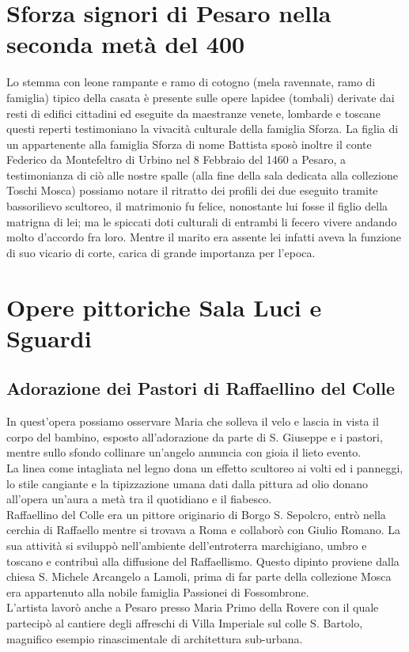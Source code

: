 \documentclass[hidelinks,12pt,a4paper]{article}
\begin{document}
\begin{flushleft}
			\section{Sforza signori di Pesaro nella seconda metà del 400}
			Lo stemma con leone rampante e ramo di cotogno (mela ravennate, ramo di famiglia) tipico della casata è presente sulle opere lapidee (tombali) derivate dai resti di edifici cittadini ed eseguite da maestranze venete, lombarde e toscane questi reperti testimoniano la vivacità culturale della famiglia Sforza. La figlia di un appartenente alla famiglia Sforza di nome Battista sposò inoltre il conte Federico da Montefeltro di Urbino nel 8 Febbraio del 1460 a Pesaro, a testimonianza di ciò alle nostre spalle (alla fine della sala dedicata alla collezione Toschi Mosca) possiamo notare il ritratto dei profili dei due eseguito tramite bassorilievo scultoreo, il matrimonio fu felice, nonostante lui fosse il figlio della matrigna di lei; ma le spiccati doti culturali di entrambi li fecero vivere andando molto d'accordo fra loro. Mentre il marito era assente lei infatti aveva la funzione di suo vicario di corte, carica di grande importanza per l'epoca.
	
			\section{Opere pittoriche Sala Luci e Sguardi} 
	
			\subsection{Adorazione dei Pastori di Raffaellino del Colle}
			In quest'opera possiamo osservare Maria che solleva il velo e lascia in vista il corpo del bambino, esposto all'adorazione da parte di S. Giuseppe e i pastori, mentre sullo sfondo collinare un'angelo annuncia con gioia il lieto evento.\\
			La linea come intagliata nel legno dona un effetto scultoreo ai volti ed i panneggi, lo stile cangiante e la tipizzazione umana dati dalla pittura ad olio donano all'opera un'aura a metà tra il quotidiano e il fiabesco.\\
			Raffaellino del Colle era un pittore originario di Borgo S. Sepolcro, entrò nella cerchia di Raffaello mentre si trovava a Roma e collaborò con Giulio Romano. La sua attività si sviluppò nell'ambiente dell'entroterra marchigiano, umbro e toscano e contribuì alla diffusione del Raffaellismo. Questo dipinto proviene dalla chiesa S. Michele Arcangelo a Lamoli, prima di far parte della collezione Mosca era appartenuto alla nobile famiglia Passionei di Fossombrone.\\
			L'artista lavorò anche a Pesaro presso Maria Primo della Rovere con il quale partecipò al cantiere degli affreschi di Villa Imperiale sul colle S. Bartolo, magnifico esempio rinascimentale di architettura sub-urbana.
	

\end{flushleft}
\end{document}
